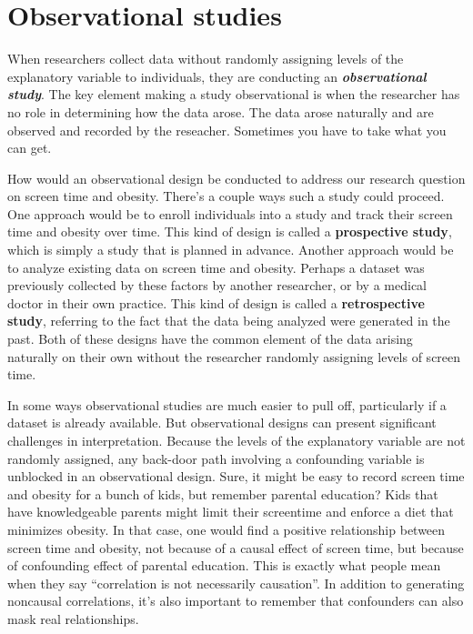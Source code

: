 \documentclass[
]{book}
\begin{document}
\section{Observational studies}\label{observational-studies}

When researchers collect data without randomly assigning levels of the explanatory variable to individuals, they are conducting an \textbf{\emph{observational study}}. The key element making a study observational is when the researcher has no role in determining how the data arose. The data arose naturally and are observed and recorded by the reseacher. Sometimes you have to take what you can get.

How would an observational design be conducted to address our research question on screen time and obesity. There's a couple ways such a study could proceed. One approach would be to enroll individuals into a study and track their screen time and obesity over time. This kind of design is called a \textbf{prospective study}, which is simply a study that is planned in advance. Another approach would be to analyze existing data on screen time and obesity. Perhaps a dataset was previously collected by these factors by another researcher, or by a medical doctor in their own practice. This kind of design is called a \textbf{retrospective study}, referring to the fact that the data being analyzed were generated in the past. Both of these designs have the common element of the data arising naturally on their own without the researcher randomly assigning levels of screen time.

In some ways observational studies are much easier to pull off, particularly if a dataset is already available. But observational designs can present significant challenges in interpretation. Because the levels of the explanatory variable are not randomly assigned, any back-door path involving a confounding variable is unblocked in an observational design. Sure, it might be easy to record screen time and obesity for a bunch of kids, but remember parental education? Kids that have knowledgeable parents might limit their screentime and enforce a diet that minimizes obesity. In that case, one would find a positive relationship between screen time and obesity, not because of a causal effect of screen time, but because of confounding effect of parental education. This is exactly what people mean when they say ``correlation is not necessarily causation''. In addition to generating noncausal correlations, it's also important to remember that confounders can also mask real relationships.
\end{document}
